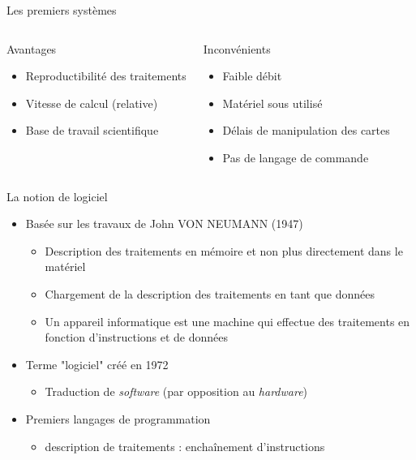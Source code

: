 \begin{frame}{Les premiers systèmes}
\begin{columns}
\begin{block}{Avantages}
\begin{itemize}
\item Reproductibilité des traitements
\item Vitesse de calcul (relative)
\item Base de travail scientifique
\end{itemize}
\end{block}
\begin{block}{Inconvénients}
\begin{itemize}
\item Faible débit
\item Matériel sous utilisé
\item Délais de manipulation des cartes
\item Pas de langage de commande
\end{itemize}
\end{block}
\end{columns}
\end{frame}

\begin{frame}{La notion de logiciel}
\begin{itemize}
\item Basée sur les travaux de John VON NEUMANN (1947)
\begin{itemize}
\item Description des traitements en mémoire et non plus directement dans le matériel
\item Chargement de la description des traitements en tant que données
\item Un appareil informatique est une machine qui effectue des traitements en fonction d'instructions et de données
\end{itemize}
\item Terme "logiciel" créé en 1972
\begin{itemize} 
\item Traduction de \textit{software} (par opposition au \textit{hardware})
\end{itemize}
\item Premiers langages de programmation
\begin{itemize}
\item description de traitements : enchaînement d'instructions
\end{itemize}
\end{itemize}
\end{frame}

